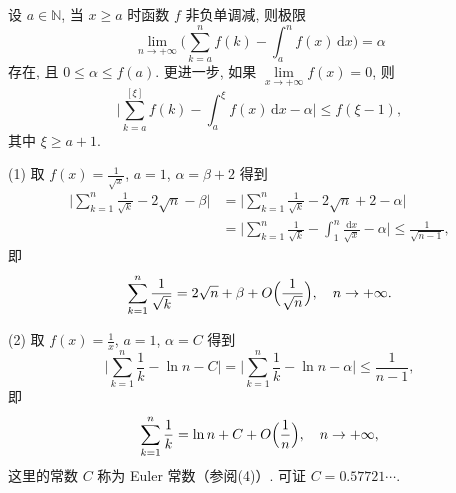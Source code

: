 \begin{lemma}\label{lem:12.3.3}
设 $a\in\mathbb{N}$, 当 $x\geqslant a$ 时函数 $f$ 非负单调减, 则极限
\[
  \lim_{n\to+\infty}\biggl(\sum_{k=a}^{n}f(k)-\int_{a}^{n}f(x)\,\mathrm{d}x\biggr)=\alpha
\]
存在, 且 $0\leqslant\alpha\leqslant f(a)$. 更进一步, 如果 $\lim\limits_{x\to+\infty}f(x)=0$, 则
\[
  \biggl|\sum_{k=a}^{[\xi]}f(k)-\int_{a}^{\xi}f(x)\,\mathrm{d}x-\alpha\biggr|
  \leqslant f(\xi-1),
\]
其中 $\xi\geqslant a+1$.

(1) 取 $f(x)=\frac{1}{\sqrt{x}}$, $a=1$, $\alpha=\beta+2$ 得到
\[
\begin{aligned}
  \biggl|\sum_{k=1}^{n}\frac{1}{\sqrt{k}}-2\sqrt{n}-\beta\biggr|
  &=\biggl|\sum_{k=1}^{n}\frac{1}{\sqrt{k}}-2\sqrt{n}+2-\alpha\biggr|\\
  &=\biggl|\sum_{k=1}^{n}\frac{1}{\sqrt{k}}-\int_{1}^{n}\frac{\mathrm{d}x}{\sqrt{x}}-\alpha\biggr|
   \leqslant\frac{1}{\sqrt{n-1}},
\end{aligned}
\]
即
\[
  \sum_{k=1}^{n}\frac{1}{\sqrt{k}}=2\sqrt{n}+\beta+O\Bigl(\frac{1}{\sqrt{n}}\Bigr),
  \quad n\to+\infty.
\]

(2) 取 $f(x)=\frac{1}{x}$, $a=1$, $\alpha=C$ 得到
\[
  \biggl|\sum_{k=1}^{n}\frac{1}{k}-\ln n-C\biggr|
  =\biggl|\sum_{k=1}^{n}\frac{1}{k}-\ln n-\alpha\biggr|
  \leqslant\frac{1}{n-1},
\]
即
\[
  \sum_{k=1}^{n}\frac{1}{k}=\ln n+C+O\Bigl(\frac{1}{n}\Bigr),
  \quad n\to+\infty,
\]
这里的常数 $C$ 称为 Euler 常数（参阅(4)）. 可证 $C=0.57721\cdots$.
\end{lemma}

